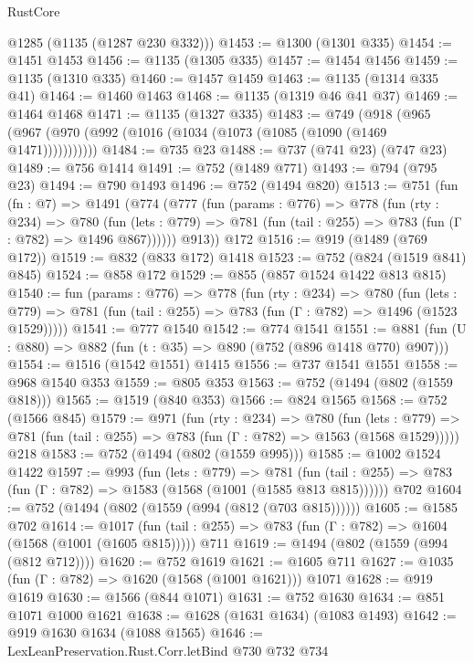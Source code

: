 \begin{lexlean}{RustCore}
\begin{coremodule}
      @1285
      (@1135 (@1287 @230 @332)))
@1453 := @1300 (@1301 @335)
@1454 := @1451 @1453
@1456 := @1135 (@1305 @335)
@1457 := @1454 @1456
@1459 := @1135 (@1310 @335)
@1460 := @1457 @1459
@1463 := @1135 (@1314 @335 @41)
@1464 := @1460 @1463
@1468 := @1135 (@1319 @46 @41 @37)
@1469 := @1464 @1468
@1471 := @1135 (@1327 @335)
@1483 := @749
    (@918 (@965 (@967 (@970 (@992 (@1016 (@1034 (@1073 (@1085 (@1090 (@1469 @1471)))))))))))
@1484 := @735 @23
@1488 := @737 (@741 @23) (@747 @23)
@1489 := @756 @1414
@1491 := @752 (@1489 @771)
@1493 := @794 (@795 @23)
@1494 := @790 @1493
@1496 := @752 (@1494 @820)
@1513 := @751
    (fun (fn : @7) =>
    @1491
      (@774
        (@777
          (fun (params : @776) =>
          @778
            (fun (rty : @234) =>
            @780
              (fun (lets : @779) =>
              @781 (fun (tail : @255) => @783 (fun (Γ : @782) => @1496 @867))))))
        @913))
    @172
@1516 := @919 (@1489 (@769 @172))
@1519 := @832 (@833 @172) @1418
@1523 := @752 (@824 (@1519 @841) @845)
@1524 := @858 @172
@1529 := @855 (@857 @1524 @1422 @813 @815)
@1540 := fun (params : @776) =>
  @778
    (fun (rty : @234) =>
    @780
      (fun (lets : @779) =>
      @781 (fun (tail : @255) => @783 (fun (Γ : @782) => @1496 (@1523 @1529)))))
@1541 := @777 @1540
@1542 := @774 @1541
@1551 := @881 (fun (U : @880) => @882 (fun (t : @35) => @890 (@752 (@896 @1418 @770) @907)))
@1554 := @1516 (@1542 @1551) @1415
@1556 := @737 @1541 @1551
@1558 := @968 @1540 @353
@1559 := @805 @353
@1563 := @752 (@1494 (@802 (@1559 @818)))
@1565 := @1519 (@840 @353)
@1566 := @824 @1565
@1568 := @752 (@1566 @845)
@1579 := @971
    (fun (rty : @234) =>
    @780
      (fun (lets : @779) =>
      @781 (fun (tail : @255) => @783 (fun (Γ : @782) => @1563 (@1568 @1529)))))
    @218
@1583 := @752 (@1494 (@802 (@1559 @995)))
@1585 := @1002 @1524 @1422
@1597 := @993
    (fun (lets : @779) =>
    @781 (fun (tail : @255) => @783 (fun (Γ : @782) => @1583 (@1568 (@1001 (@1585 @813 @815))))))
    @702
@1604 := @752 (@1494 (@802 (@1559 (@994 (@812 (@703 @815))))))
@1605 := @1585 @702
@1614 := @1017
    (fun (tail : @255) => @783 (fun (Γ : @782) => @1604 (@1568 (@1001 (@1605 @815)))))
    @711
@1619 := @1494 (@802 (@1559 (@994 (@812 @712))))
@1620 := @752 @1619
@1621 := @1605 @711
@1627 := @1035 (fun (Γ : @782) => @1620 (@1568 (@1001 @1621))) @1071
@1628 := @919 @1619
@1630 := @1566 (@844 @1071)
@1631 := @752 @1630
@1634 := @851 @1071 @1000 @1621
@1638 := @1628 (@1631 @1634) (@1083 @1493)
@1642 := @919 @1630 @1634 (@1088 @1565)
@1646 := LexLeanPreservation.Rust.Corr.letBind @730 @732 @734

\end{coremodule}
\end{lexlean}
